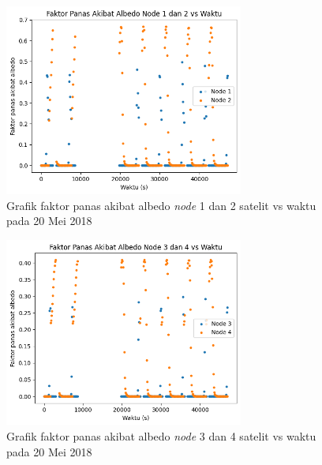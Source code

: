 \begin{figure}[H]
\setlength{}
\begin{center}
\includegraphics[width=0.7\textwidth]{fig/albedo_node12_2018-05-20.png}
	\caption{Grafik faktor panas akibat albedo \textit{node} 1 dan 2 satelit vs waktu pada 20 Mei 2018}
\label{fig:albedo1220}
\end{center}
\end{figure}

\begin{figure}[H]
\setlength{}
\begin{center}
\includegraphics[width=0.7\textwidth]{fig/albedo_node34_2018-05-20.png}
	\caption{Grafik faktor panas akibat albedo \textit{node} 3 dan 4 satelit vs waktu pada 20 Mei 2018}
\label{fig:albedo3420}
\end{center}
\end{figure}

